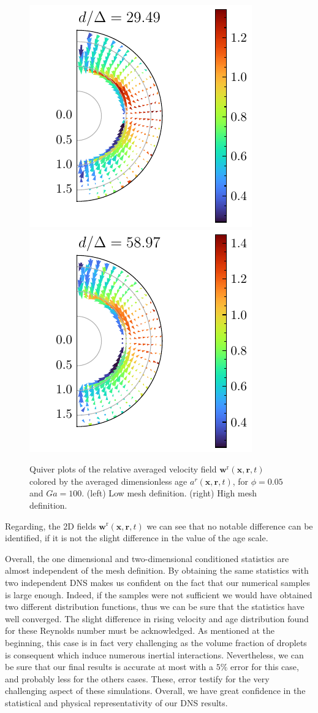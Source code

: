 \begin{figure}[h!]
    \centering
    \includegraphics[height = 0.3\textwidth]{image/HOMOGENEOUS_NEW/VAL/U_rel_ndc_25.pdf}
    \includegraphics[height = 0.3\textwidth]{image/HOMOGENEOUS_NEW/VAL/U_rel_ndc_35.pdf}
    \caption{Quiver plots of the relative averaged velocity field $\textbf{w}^\text{r}(\textbf{x},\textbf{r},t)$ colored by the averaged dimensionless age $a^r(\textbf{x},\textbf{r},t)$, for $\phi = 0.05$ and $Ga = 100$. 
    (left) Low mesh definition.
    (right) High mesh definition. 
    }
    \label{fig:velap}
\end{figure}
Regarding, the 2D fields  $\textbf{w}^\text{r}(\textbf{x},\textbf{r},t)$ we can see that no notable difference can be identified, if it is not the slight difference in the value of the age scale. 


Overall, the one dimensional and two-dimensional conditioned statistics are almost independent of the mesh definition. 
By obtaining the same statistics with two independent DNS makes us confident on the fact that our numerical samples is large enough.
Indeed, if the samples were not sufficient we would have obtained two different distribution functions, thus we can be sure that the statistics have well converged. 
The slight difference in rising velocity and age distribution found for these Reynolds number must be acknowledged.
As mentioned at the beginning, this case is in fact very challenging as the volume fraction of droplets is consequent which induce numerous inertial interactions. 
Nevertheless, we can be sure that our final results is accurate at most with a $5\%$ error for this case, and probably less for the others cases. 
These, error testify for the very challenging  aspect of these simulations. 
Overall, we have great confidence in the statistical and physical representativity of our DNS results. 